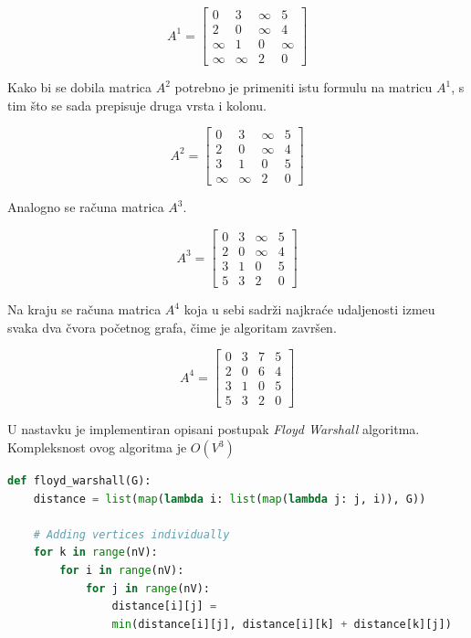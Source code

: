 $$A^{1} = \begin{bmatrix}
0 & 3 & \infty & 5\\
2 & 0 & \infty & 4\\
\infty & 1 & 0 & \infty\\
\infty & \infty & 2 & 0
\end{bmatrix}$$

Kako bi se dobila matrica $A^{2}$ potrebno je primeniti istu formulu na matricu $A^{1}$, s tim \v sto se sada prepisuje druga vrsta i kolonu.

$$A^{2} = \begin{bmatrix}
0 & 3 & \infty & 5\\
2 & 0 & \infty & 4\\
3 & 1 & 0 & 5\\
\infty & \infty & 2 & 0
\end{bmatrix}$$

Analogno se ra\v cuna matrica $A^{3}$. 

$$A^{3} = \begin{bmatrix}
0 & 3 & \infty & 5\\
2 & 0 & \infty & 4\\
3 & 1 & 0 & 5\\
5 & 3 & 2 & 0
\end{bmatrix}$$

Na kraju se ra\v cuna matrica $A^{4}$ koja u sebi sadr\v zi najkra\' ce udaljenosti izme\dj u svaka dva \v cvora po\v cetnog grafa, \v cime je algoritam zavr\v sen.

$$A^{4} = \begin{bmatrix}
0 & 3 & 7 & 5\\
2 & 0 & 6 & 4\\
3 & 1 & 0 & 5\\
5 & 3 & 2 & 0
\end{bmatrix}$$

U nastavku je implementiran opisani postupak {\it\textenglish{Floyd Warshall}} algoritma. Kompleksnost ovog algoritma je $O(V^{3})$

\begin{english}
\begin{lstlisting}[language=Python]
def floyd_warshall(G):
    distance = list(map(lambda i: list(map(lambda j: j, i)), G))

    # Adding vertices individually
    for k in range(nV):
        for i in range(nV):
            for j in range(nV):
                distance[i][j] = 
                min(distance[i][j], distance[i][k] + distance[k][j])
\end{lstlisting}
\end{english}

